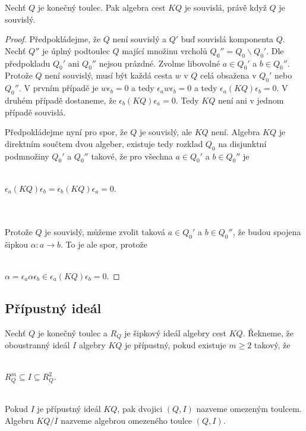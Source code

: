     \begin{lem}\label{lem-q-kq-souvisle}
      Nechť $Q$ je konečný toulec. Pak algebra cest $KQ$ je souvislá, právě když 
      $Q$ je souvislý. 
    \end{lem}
    \begin{proof}
      Předpokládejme, že $Q$ není souvislý a $Q'$ buď souvislá komponenta $Q$. 
      Nechť $Q''$ je úplný podtoulec $Q$ mající množinu vrcholů 
      $Q_0''=Q_0\backslash Q_0'$. Dle předpokladu $Q_0'$ ani $Q_0''$ nejsou prázdné. 
      Zvolme libovolné $a\in Q_0'$ a $b\in Q_0''$. Protože $Q$ není souvislý, 
      musí být každá cesta $w$ v $Q$ celá obsažena v $Q_0'$ nebo $Q_0''$. V 
      prvním případě je $w\epsilon_b=0$ a tedy $\epsilon_a w \epsilon_b=0$ a 
      tedy $\epsilon_a (KQ) \epsilon_b=0$. V druhém případě dostaneme, že $\epsilon_b (KQ) 
      \epsilon_a=0$. Tedy $KQ$ není ani v jednom případě souvislá.
      
      Předpokládejme nyní pro spor, že $Q$ je souvislý, ale $KQ$ není. Algebra $KQ$ 
      je direktním součtem dvou algeber, existuje tedy rozklad $Q_0$ na 
      disjunktní podmnožiny $Q_0'$ a $Q_0''$ takové, že pro všechna $a\in Q_0'$ 
      a $b\in Q_0''$ je \\\\
      \centerline{$\epsilon_a(KQ)\epsilon_b=\epsilon_b(KQ)\epsilon_a=0$.}\\\\  
      Protože $Q$ je souvislý, 
      můžeme zvolit taková $a\in Q_0'$  a $b\in Q_0''$, že budou spojena šipkou $\alpha:a\to b$. 
      To je ale spor, protože\\\\
      \centerline{$\alpha=\epsilon_a\alpha\epsilon_b\in 
      \epsilon_a(KQ)\epsilon_b=0$.}
    \end{proof}
    
  \subsection{Přípustný ideál}
    
    \begin{dfn}
      Nechť $Q$ je konečný toulec a $R_Q$ je šipkový ideál algebry cest $KQ$. 
      Řekneme, že oboustranný ideál $I$ algebry $KQ$ je přípustný, pokud 
      existuje $m\geq 2$ takový, že \\\\
      \centerline{$R_Q^m\subseteq I \subseteq R_Q^2$.}\\
      
      Pokud $I$ je přípustný ideál $KQ$, pak dvojici $(Q,I)$ nazveme omezeným 
      toulcem. Algebru $KQ/I$ nazveme algebrou omezeného toulce $(Q,I)$.
    \end{dfn}
    
